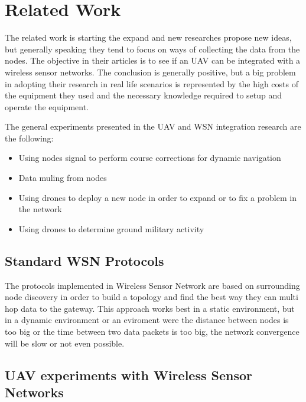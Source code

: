\normalfont\normalsize
\chapter{Related Work}
\label{chap:related}

The related work is starting the expand and new researches propose new ideas, but generally speaking they tend to focus on ways of collecting the data from the nodes. The objective in their articles is to see if an UAV can be integrated with a wireless sensor networks. The conclusion is generally positive, but a big problem in adopting their research in real life scenarios is represented by the high costs of the equipment they used and the necessary knowledge required to setup and operate the equipment.

The general experiments presented in the UAV and WSN integration research are the following:

\begin{itemize}

\item Using nodes signal to perform course corrections for dynamic navigation
\item Data muling from nodes 
\item Using drones to deploy a new node in order to expand or to fix a problem in the network
\item Using drones to determine ground military activity \cite{akyildiz2002wireless}

\end{itemize}


\section{Standard WSN Protocols}

The protocols implemented in Wireless Sensor Network are based on surrounding node discovery in order to build a topology and find the best way they can multi hop data to the gateway. This approach works best in a static environment, but in a dynamic environment or an eviroment were the distance between nodes is too big or the time between two data packets is too big, the network convergence will be slow or not even possible.

\section{UAV experiments with Wireless Sensor Networks} \cite{teh2008experiments} 

